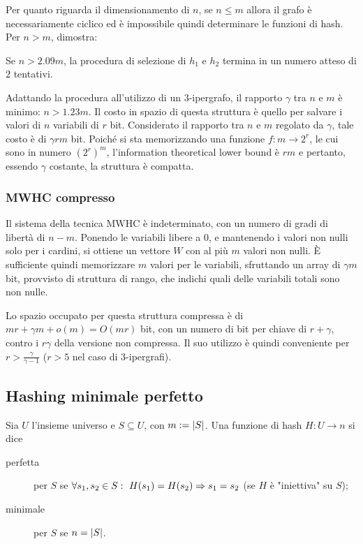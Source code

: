 
Per quanto riguarda il dimensionamento di $n$, se $n\leq m$ allora il grafo è necessariamente ciclico ed è impossibile quindi determinare le funzioni di hash.
Per $n>m$, \cite{Majewski:96:MWHC} dimostra:
\begin{theorem}
	Se $n>2.09m$, la procedura di selezione di $h_1$ e $h_2$ termina in un numero atteso di $2$ tentativi.
\end{theorem}
Adattando la procedura all'utilizzo di un $3$-ipergrafo, il rapporto $\gamma$ tra $n$ e $m$ è minimo: $n>1.23m$.
Il costo in spazio di questa struttura è quello per salvare i valori di $n$ variabili di $r$ bit. Considerato il rapporto tra $n$ e $m$ regolato da $\gamma$, tale costo è di $\gamma rm$ bit. Poiché si sta memorizzando una funzione $f:m\to 2^r$, le cui sono in numero $(2^r)^m$, l'information theoretical lower bound è $rm$ e pertanto, essendo $\gamma$ costante, la struttura è compatta.

\subsubsection{MWHC compresso}
Il sistema della tecnica MWHC è indeterminato, con un numero di gradi di libertà di $n-m$. Ponendo le variabili libere a $0$, e mantenendo i valori non nulli solo per i cardini, si ottiene un vettore $W$ con al più $m$ valori non nulli.
È sufficiente quindi memorizzare $m$ valori per le variabili, sfruttando un array di $\gamma m$ bit, provvisto di struttura di rango, che indichi quali delle variabili totali sono non nulle.

Lo spazio occupato per questa struttura compressa è di $mr+\gamma m+o(m)=O(mr)$ bit, con un numero di bit per chiave di $r+\gamma$, contro i $r\gamma$ della versione non compressa.
Il suo utilizzo è quindi conveniente per $r>\frac{\gamma}{\gamma-1}$ ($r>5$ nel caso di $3$-ipergrafi).


\subsection{Hashing minimale perfetto}
Sia $U$ l'insieme universo e $S\subseteq U$, con $m:=| S |$. Una funzione di hash $H:U\to n$ si dice
\begin{description}
	\item[perfetta] per $S$ se $\forall s_1,s_2\in S:~H(s_1)=H(s_2)\Rightarrow s_1=s_2$ (se $H$ è "iniettiva" su $S$);
	\item[minimale] per $S$ se $n=| S |$.
\end{description}

